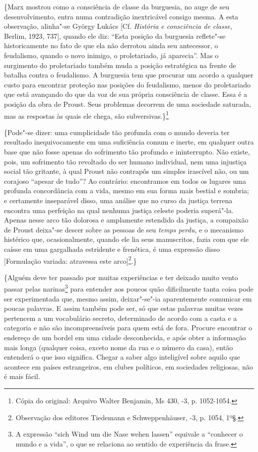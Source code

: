 \{Marx mostrou como a consciência de classe da burguesia, no auge de seu
desenvolvimento, entra numa contradição inextricável consigo mesma. A
esta observação, alinha"-se György Lukács {[}Cf. \emph{História e
consciência de classe}, Berlim, 1923, 737{]}, quando ele diz: ``Esta %
posição da burguesia reflete"-se historicamente no fato de que ela não
derrotou ainda seu antecessor, o feudalismo, quando o novo inimigo, o
proletariado, já aparecia''. Mas o surgimento do proletariado também
muda a posição estratégica na frente de batalha contra o feudalismo. A
burguesia tem que procurar um acordo a qualquer custo para encontrar
proteção nas posições do feudalismo, menos do proletariado que está
avançando do que da voz de sua própria consciência de classe. Essa é a
posição da obra de Proust. Seus problemas decorrem de uma sociedade
saturada, mas as respostas às quais ele chega, são subversivas.\}\footnote{Cópia do original: Arquivo Walter Benjamin, Ms 430, -3, p. 1052-1054.}

\{Pode"-se dizer: uma cumplicidade tão profunda com o mundo deveria ter
resultado inequivocamente em uma suficiência comum e inerte, em qualquer
outra base que não fosse apenas do sofrimento tão profundo e
ininterrupto. Não existe, pois, um sofrimento tão revoltado do ser
humano individual, nem uma injustiça social tão gritante, à qual Proust
não contrapôs um simples irascível não, ou um corajoso ``apesar de
tudo''? Ao contrário: encontramos em todos os lugares uma profunda
concordância com a vida, mesmo em sua forma mais bestial e sombria; e
certamente inseparável disso, uma análise que no curso da justiça
terrena encontra uma perfeição na qual nenhuma justiça celeste poderia
superá"-la. Apenas nesse arco tão dolorosa e amplamente estendido da
justiça, a compaixão de Proust deixa"-se descer sobre as pessoas de seu
\emph{temps perdu,} e o mecanismo histérico que, ocasionalmente, quando
ele lia seus manuscritos, fazia com que ele caísse em uma gargalhada
estridente e frenética, é uma expressão disso {[}Formulação variada:
atravessa este arco{]}\footnote{Observação dos editores Tiedemann e
  Schweppenhäuser, -3, p. 1054, 1º§. \versal{[N. T.]}}.\}

\{Alguém deve ter passado por muitas experiências e ter deixado muito
vento passar pelas narinas\footnote{A expressão ``sich Wind um die
  Nase wehen lassen'' equivale a ``conhecer o mundo e a vida'', o que se
  relaciona ao sentido de experiência da frase. \versal{[N. T.]}} para entender aos
poucos quão dificilmente tanta coisa pode ser experimentada que, mesmo
assim, deixar"-se"-ia aparentemente comunicar em poucas palavras. E assim
também pode ser, só que estas palavras muitas vezes pertencem a um
vocabulário secreto, determinado de acordo com a casta e a categoria e %
não são incompreensíveis para quem está de fora. Procure encontrar o
endereço de um bordel em uma cidade desconhecida, e após obter a
informação mais longa (qualquer coisa, exceto nome da rua e o número da
casa), então entenderá o que isso significa. Chegar a saber algo
inteligível sobre aquilo que acontece em países estrangeiros, em clubes
políticos, em sociedades religiosas, não é mais fácil.

